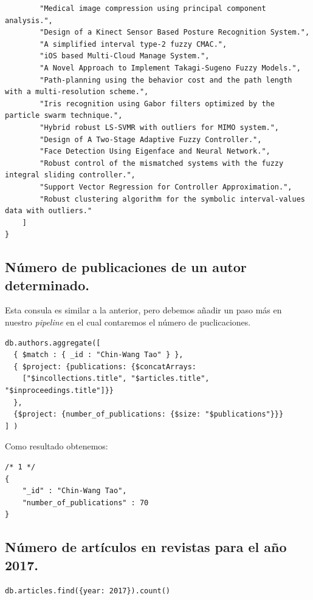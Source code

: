\begin{verbatim}
        "Medical image compression using principal component analysis.", 
        "Design of a Kinect Sensor Based Posture Recognition System.", 
        "A simplified interval type-2 fuzzy CMAC.", 
        "iOS based Multi-Cloud Manage System.", 
        "A Novel Approach to Implement Takagi-Sugeno Fuzzy Models.", 
        "Path-planning using the behavior cost and the path length with a multi-resolution scheme.", 
        "Iris recognition using Gabor filters optimized by the particle swarm technique.", 
        "Hybrid robust LS-SVMR with outliers for MIMO system.", 
        "Design of A Two-Stage Adaptive Fuzzy Controller.", 
        "Face Detection Using Eigenface and Neural Network.", 
        "Robust control of the mismatched systems with the fuzzy integral sliding controller.", 
        "Support Vector Regression for Controller Approximation.", 
        "Robust clustering algorithm for the symbolic interval-values data with outliers."
    ]
}
\end{verbatim}


\subsection{Número de publicaciones de un autor determinado.}

Esta consula es similar a la anterior, pero debemos añadir un paso más en nuestro \textit{pipeline} en el cual contaremos el número de puclicaciones.

\begin{verbatim}
db.authors.aggregate([
  { $match : { _id : "Chin-Wang Tao" } }, 
  { $project: {publications: {$concatArrays: 
    ["$incollections.title", "$articles.title", "$inproceedings.title"]}}
  },
  {$project: {number_of_publications: {$size: "$publications"}}}
] )
\end{verbatim}


Como resultado obtenemos:

\begin{verbatim}
/* 1 */
{
    "_id" : "Chin-Wang Tao",
    "number_of_publications" : 70
}
\end{verbatim}

\subsection{Número de artículos en revistas para el año 2017.}

\begin{verbatim}
db.articles.find({year: 2017}).count()
\end{verbatim}

